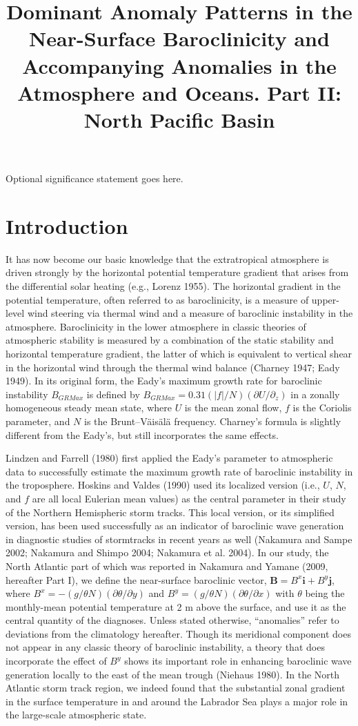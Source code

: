 \documentclass{ametsocV5}
\title{Dominant Anomaly Patterns in the Near-Surface 
Baroclinicity and Accompanying
Anomalies in the Atmosphere and Oceans. 
Part II: North Pacific Basin}
\affiliation{Japan Agency for Marine-Earth Science and Technology, Yokohama,
Kanagawa, Japan}
\begin{document}
\maketitle

\statement
Optional significance statement goes here.

\section{Introduction}

It has now become our basic
knowledge that the extratropical
atmosphere is driven strongly by the horizontal
potential temperature gradient that arises from the
differential solar heating (e.g., Lorenz 1955). The horizontal
gradient in the potential temperature, often referred
to as baroclinicity, is a measure of upper-level wind
steering via thermal wind and a measure of baroclinic
instability in the atmosphere. Baroclinicity in the lower
atmosphere in classic theories of atmospheric stability is
measured by a combination of the static stability and
horizontal temperature gradient, the latter of which is
equivalent to vertical shear in the horizontal wind through
the thermal wind balance (Charney 1947; Eady 1949). In
its original form, the Eady's maximum growth rate for
baroclinic instability $B_{GRMax}$ is defined by $B_{GRMax} =
0.31(|f|/N)(\partial U/\partial_z)$ in a zonally homogeneous steady
mean state, where $U$ is the mean zonal flow, $f$ is the
Coriolis parameter, and $N$ is the Brunt--V\"ais\"al\"a frequency.
Charney's formula is slightly different from the Eady's,
but still incorporates the same effects.


Lindzen and Farrell (1980) first applied the Eady's parameter
to atmospheric data to successfully estimate the
maximum growth rate of baroclinic instability in the troposphere.
Hoskins and Valdes (1990) used its localized
version (i.e., $U$, $N$, and $f$ are all local Eulerian mean values)
as the central parameter in their study of the Northern
Hemispheric storm tracks. This local version, or its simplified
version, has been used successfully as an indicator
of baroclinic wave generation in diagnostic studies of
stormtracks in recent years as well (Nakamura and Sampe
2002; Nakamura and Shimpo 2004; Nakamura et al. 2004).
In our study, the North Atlantic part of which was reported
in Nakamura and Yamane (2009, hereafter Part I), we
define the near-surface baroclinic vector, $\mathbf{B}=B^x\mathbf{i} + 
B^y\mathbf{j}$,
where $B^x= -(g/\theta N)(\partial\theta/\partial y)$ 
and $B^y = (g/\theta N)(\partial\theta/\partial x)$  with
$\theta$ being the monthly-mean potential temperature at 2 m
above the surface, and use it as the central quantity of the
diagnoses. Unless stated otherwise, ``anomalies'' refer to
deviations from the climatology hereafter. Though its meridional
component does not appear in any classic theory of
baroclinic instability, a theory that does incorporate the
effect of $B^y$ shows its important role in enhancing baroclinic
wave generation locally to the east of the mean trough
(Niehaus 1980). In the North Atlantic storm track region,
we indeed found that the substantial zonal gradient in the
surface temperature in and around the Labrador Sea plays
a major role in the large-scale atmospheric state.
\end{document}
